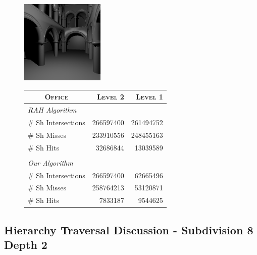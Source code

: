 \begin{figure}[!htb]
    \begin{minipage}{0.25\linewidth}
        \centering
        \includegraphics[width=4.0cm]{Images/Sponza_Preview}
    \end{minipage}
    \begin{minipage}{0.725\linewidth}
        \centering
        \fontsize{8}{10}
        \selectfont
        \begin{tabular}[h]{l|rr}
            \multicolumn{1}{c|}{\textsc{Office}} & \textsc{Level 2} & \textsc{Level 1}\\
            \hline
            \emph{RAH Algorithm} & & \\
            \hline
            \quad \# Sh Intersections  & 266597400	& 261494752	  \\
            \quad \# Sh Misses            & 233910556  & 248455163	  \\
            \quad \# Sh Hits              & 32686844	& 13039589	  \\
            & & \\
            \hline
            \emph{Our Algorithm} & & \\
            \hline
            \quad \# Sh Intersections   & 266597400 & 62665496	  \\
            \quad \# Sh Misses          & 258764213 & 53120871	  \\
            \quad \# Sh Hits            & 7833187	& 9544625	  \\
        \end{tabular}
        \label{table:sponza-d8-n2-results}
    \end{minipage}
\end{figure}

\subsection{Hierarchy Traversal Discussion - Subdivision 8 Depth 2}

